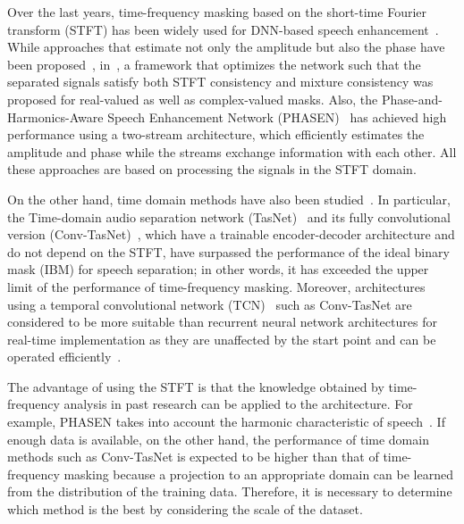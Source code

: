 \documentclass[a4paper]{article}
\begin{document}
\begin{spacing}{0.9}
Over the last years, time-frequency masking based on the short-time Fourier transform (STFT) has been widely used for DNN-based speech enhancement~\cite{narayanan2013ideal,wang2014structure,wang2014on,soni2018time,xia2020weighted}. 
While approaches that estimate not only the amplitude but also the phase have been proposed~\cite{takahashi2018phasenet,williamson2015complex}, in~\cite{wisdom2019differentiable}, a framework that optimizes the network such that the separated signals satisfy both STFT consistency and mixture consistency was proposed for real-valued as well as complex-valued masks. 
Also, the Phase-and-Harmonics-Aware Speech Enhancement Network (PHASEN)~\cite{yin2019phasen} has achieved high performance using a two-stream architecture, which efficiently estimates the amplitude and phase while the streams exchange information with each other.
All these approaches are based on processing the signals in the STFT domain.


On the other hand, time domain methods have also been studied~\cite{pascual2017segan,rethage2018wavenet,germain2018speech}. 
In particular, the Time-domain audio separation network (TasNet)~\cite{luo2018tasnet} and its fully convolutional version (Conv-TasNet)~\cite{luo2019conv}, which have a trainable encoder-decoder architecture and do not depend on the STFT, have  surpassed the performance of the ideal binary mask (IBM) for speech separation; in other words, it has exceeded the upper limit of the performance of time-frequency masking. 
Moreover, architectures using a temporal convolutional network (TCN)~\cite{lea2016temporal,lea2017temporal,bai2018empirical} such as Conv-TasNet are considered to be more suitable than recurrent neural network architectures for real-time implementation as they are unaffected by the start point
and can be operated efficiently~\cite{luo2019conv, bai2018empirical}.

The advantage of using the STFT is that the knowledge obtained by  time-frequency analysis in past research can be applied to the architecture. For example, PHASEN takes into account the harmonic characteristic of speech~\cite{yin2019phasen}. 
If enough data is available, on the other hand, the performance of time domain methods such as Conv-TasNet is expected to be higher than that of time-frequency masking because a projection to an appropriate domain can be learned from the distribution of the training data. Therefore, it is necessary to determine which method is the best by considering the scale of the dataset.


\end{spacing}
\end{document}
